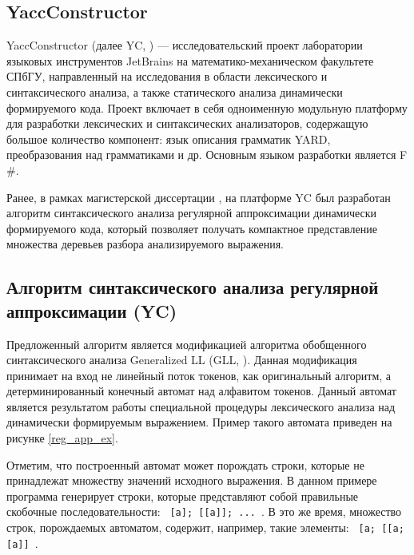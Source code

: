 \documentclass[14pt]{matmex-diploma-custom}
\begin{document}
\subsection{YaccConstructor}

YaccConstructor (далее YC, \cite{yc}) --- исследовательский проект лаборатории языковых инструментов  JetBrains на математико-механическом факультете СПбГУ, направленный на исследования в области лексического и синтаксического анализа, а также статического анализа динамически формируемого кода. Проект включает в себя одноименную модульную платформу для разработки лексических и синтаксических анализаторов, содержащую большое количество компонент: язык описания грамматик YARD, преобразования над грамматиками и др. Основным языком разработки является F$\#$.

Ранее, в рамках магистерской диссертации \cite{nastya}, на платформе YC был разработан алгоритм синтаксического анализа регулярной аппроксимации динамически формируемого кода, который позволяет получать компактное представление множества деревьев разбора анализируемого выражения.

\subsection{Алгоритм синтаксического анализа регулярной аппроксимации (YC)}
Предложенный алгоритм является модификацией алгоритма обобщенного синтаксического анализа Generalized LL (GLL, \cite{gll}). Данная модификация принимает на вход не линейный поток токенов, как оригинальный алгоритм, а детерминированный конечный автомат над алфавитом токенов. Данный автомат является результатом работы специальной процедуры лексического анализа над динамически формируемым выражением. Пример такого автомата приведен на рисунке \ref{reg_app_ex}.

Отметим, что построенный автомат может порождать строки, которые не принадлежат множеству значений исходного выражения. В данном примере программа генерирует строки, которые представляют собой правильные скобочные последовательности: \verb+ [a]; [[a]]; ... +. В это же время, множество строк, порождаемых автоматом, содержит, например, такие элементы: \verb+ [a; [[a; [a]] +.
\end{document}
